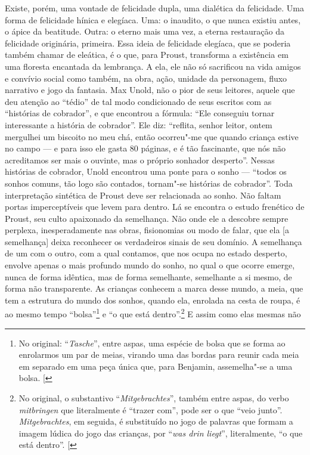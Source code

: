 Existe, porém, uma vontade de felicidade dupla, uma dialética da
felicidade. Uma forma de felicidade hínica e elegíaca. Uma: o inaudito,
o que nunca existiu antes, o ápice da beatitude. Outra: o eterno mais
uma vez, a eterna restauração da felicidade originária, primeira. Essa
ideia de felicidade elegíaca, que se poderia também chamar de eleática,
é o que, para Proust, transforma a existência em uma floresta encantada
da lembrança. A ela, ele não só sacrificou na vida amigos e convívio
social como também, na obra, ação, unidade da personagem, fluxo
narrativo e jogo da fantasia. Max Unold, não o pior de seus leitores,
aquele que deu atenção ao ``tédio'' de tal modo condicionado de seus
escritos com as ``histórias de cobrador'', e que encontrou a fórmula:
``Ele conseguiu tornar interessante a história de cobrador''. Ele diz:
``reflita, senhor leitor, ontem mergulhei um biscoito no meu chá, então
ocorreu"-me que quando criança estive no campo --- e para isso ele gasta 80
páginas, e é tão fascinante, que nós não acreditamos ser mais o ouvinte,
mas o próprio sonhador desperto''. Nessas histórias de cobrador, Unold
encontrou uma ponte para o sonho --- ``todos os sonhos comuns, tão logo
são contados, tornam"-se histórias de cobrador''. Toda interpretação
sintética de Proust deve ser relacionada ao sonho. Não faltam portas
imperceptíveis que levem para dentro. Lá se encontra o estudo frenético
de Proust, seu culto apaixonado da semelhança. Não onde ele a descobre
sempre perplexa, inesperadamente nas obras, fisionomias ou modo de
falar, que ela {[}a semelhança{]} deixa reconhecer os verdadeiros sinais
de seu domínio. A semelhança de um com o outro, com a qual contamos, que
nos ocupa no estado desperto, envolve apenas o mais profundo mundo do
sonho, no qual o que ocorre emerge, nunca de forma idêntica, mas de
forma semelhante, semelhante a si mesmo, de forma não transparente. As
crianças conhecem a marca desse mundo, a meia, que tem a estrutura do
mundo dos sonhos, quando ela, enrolada na cesta de roupa, é ao mesmo
tempo ``bolsa''\footnote{No original: ``\emph{Tasche}'', entre aspas, uma espécie de bolsa que se forma ao enrolarmos um par de meias, virando uma das bordas para reunir cada meia em separado em uma peça única que, para Benjamin, assemelha"-se a uma bolsa. {[}\versal{N.~T.}{]}} e ``o que está dentro''.\footnote{No original, o substantivo ``\emph{Mitgebrachtes}'', também entre aspas, do verbo \emph{mitbringen} que literalmente é ``trazer com'', pode ser o que ``veio junto''. \emph{Mitgebrachtes}, em seguida, é substituído no jogo de palavras que formam a imagem lúdica do jogo das crianças, por ``\emph{was drin liegt}'', literalmente, ``o que está dentro''. {[}\versal{N.~T.}{]}} E assim como elas mesmas não
